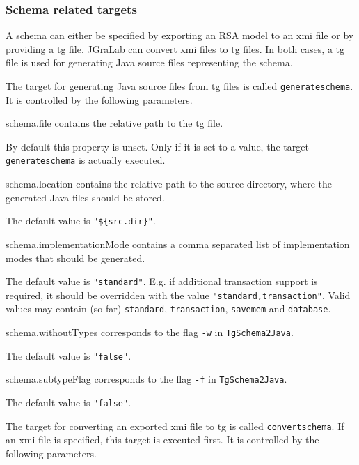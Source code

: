 \documentclass[a4paper,twoside,11pt,bibtotoc]{article}
\begin{document}
\subsubsection{Schema related targets}
A schema can either be specified by exporting an RSA model to an xmi file or by providing a tg file.
JGraLab can convert xmi files to tg files.
In both cases, a tg file is used for generating Java source files representing the schema.

The target for generating Java source files from tg files is called \texttt{generateschema}.
It is controlled by the following parameters.

\begin{description*}
	\item[schema.file] contains the relative path to the tg file.\par By default this property is unset. Only if it is set to a value, the target \texttt{generateschema} is actually executed.
	\item[schema.location] contains the relative path to the source directory, where the generated Java files should be stored.\par The default value is \texttt{"\$\{src.dir\}"}.
	\item[schema.implementationMode] contains a comma separated list of implementation modes that should be generated.\par The default value is \texttt{"standard"}. E.g. if additional transaction support is required, it should be overridden with the value \texttt{"standard,transaction"}. Valid values may contain (so-far) \texttt{standard}, \texttt{transaction}, \texttt{savemem} and \texttt{database}.
	\item[schema.withoutTypes] corresponds to the flag \texttt{-w} in \texttt{TgSchema2Java}.\par The default value is \texttt{"false"}.
	\item[schema.subtypeFlag] corresponds to the flag \texttt{-f} in \texttt{TgSchema2Java}.\par The default value is \texttt{"false"}.
\end{description*}

The target for converting an exported xmi file to tg is called \texttt{convertschema}.
If an xmi file is specified, this target is executed first.
It is controlled by the following parameters.
\end{document}

